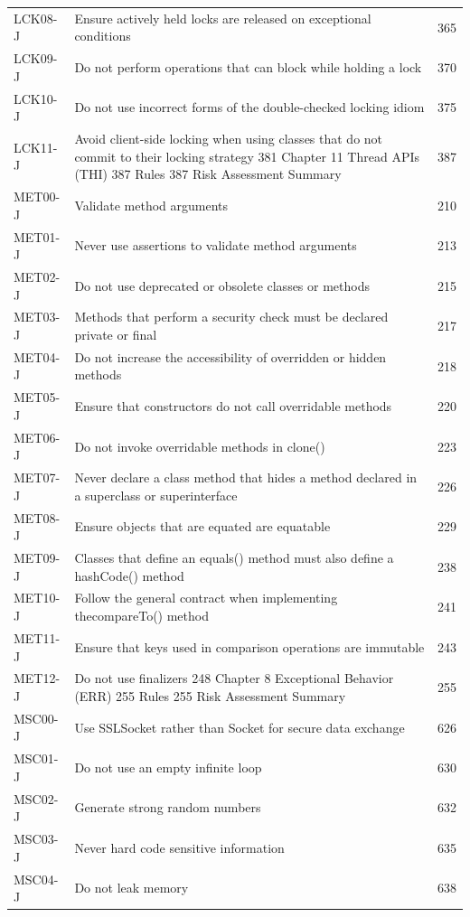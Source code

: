 \documentclass[11pt]{report}
\begin{document}
\begin{longtable}{@{}llr@{}}
LCK08-J & Ensure actively held locks are released on exceptional conditions & 365\\
LCK09-J & Do not perform operations that can block while holding a lock & 370\\
LCK10-J & Do not use incorrect forms of the double-checked locking idiom & 375\\
LCK11-J & Avoid client-side locking when using classes that do not commit to their locking strategy 381 Chapter 11 Thread APIs (THI) 387 Rules 387 Risk Assessment Summary & 387\\
MET00-J & Validate method arguments & 210\\
MET01-J & Never use assertions to validate method arguments & 213\\
MET02-J & Do not use deprecated or obsolete classes or methods & 215\\
MET03-J & Methods that perform a security check must be declared private or final & 217\\
MET04-J & Do not increase the accessibility of overridden or hidden methods & 218\\
MET05-J & Ensure that constructors do not call overridable methods & 220\\
MET06-J & Do not invoke overridable methods in clone() & 223\\
MET07-J & Never declare a class method that hides a method declared in a superclass or superinterface & 226\\
MET08-J & Ensure objects that are equated are equatable & 229\\
MET09-J & Classes that define an equals() method must also define a hashCode() method & 238\\
MET10-J & Follow the general contract when implementing thecompareTo() method & 241\\
MET11-J & Ensure that keys used in comparison operations are immutable & 243\\
MET12-J & Do not use finalizers 248 Chapter 8 Exceptional Behavior (ERR) 255 Rules 255 Risk Assessment Summary & 255\\
MSC00-J & Use SSLSocket rather than Socket for secure data exchange & 626\\
MSC01-J & Do not use an empty infinite loop & 630\\
MSC02-J & Generate strong random numbers & 632\\
MSC03-J & Never hard code sensitive information & 635\\
MSC04-J & Do not leak memory & 638\\

\end{longtable}
\end{document}
